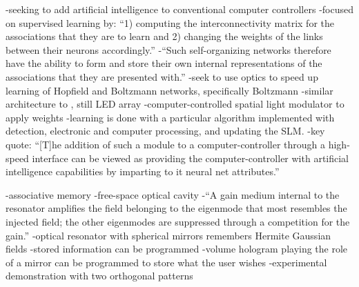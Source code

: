 \cite{fa1987}
-seeking to add artificial intelligence to conventional computer controllers
-focused on supervised learning by: ``1) computing the interconnectivity matrix for the associations that they are to learn and 2) changing the weights of the links between their neurons accordingly.''
-``Such self-organizing networks therefore have the ability to form and store their own internal representations of the associations that they are presented with.''
-seek to use optics to speed up learning of Hopfield and Boltzmann networks, specifically Boltzmann
-similar architecture to \cite{faps1985}, still LED array
-computer-controlled spatial light modulator to apply weights
-learning is done with a particular algorithm implemented with detection, electronic and computer processing, and updating the SLM.
-key quote: ``[T]he addition of such a module to a computer-controller through a high-speed interface can be viewed as providing the computer-controller with artificial intelligence capabilities by imparting to it neural net attributes.''

\cite{an1986}
-associative memory
-free-space optical cavity
-``A gain medium internal to the resonator amplifies the field belonging to the eigenmode that most resembles the injected field; the other eigenmodes are suppressed through a competition for the gain.''
-optical resonator with spherical mirrors remembers Hermite Gaussian fields
-stored information can be programmed
-volume hologram playing the role of a mirror can be programmed to store what the user wishes
-experimental demonstration with two orthogonal patterns


